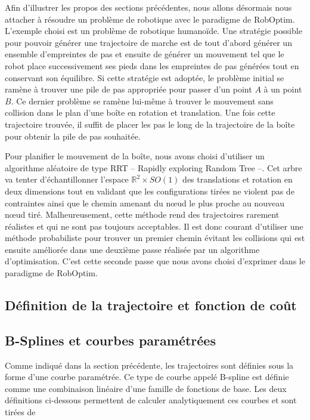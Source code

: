 Afin d'illustrer les propos des sections précédentes, nous allons
désormais nous attacher à résoudre un problème de robotique avec le
paradigme de RobOptim. L'exemple choisi est un problème de robotique
humanoïde. Une stratégie possible pour pouvoir générer une trajectoire
de marche est de tout d'abord générer un ensemble d'empreintes de pas
et ensuite de générer un mouvement tel que le robot place
successivement ses pieds dans les empreintes de pas générées tout en
conservant son équilibre. Si cette stratégie est adoptée, le problème
initial se ramène à trouver une pile de pas appropriée pour passer
d'un point $A$ à un point $B$. Ce dernier problème se ramène lui-même
à trouver le mouvement sans collision dans le plan d'une boîte en
rotation et translation. Une fois cette trajectoire trouvée, il suffit
de placer les pas le long de la trajectoire de la boîte pour obtenir
la pile de pas souhaitée.


Pour planifier le mouvement de la boîte, nous avons choisi d'utiliser
un algorithme aléatoire de type RRT -- Rapidly exploring Random Tree
--. Cet arbre va tenter d'échantillonner l'espace $\mathbb{R}^2 \times
SO(1)$ des translations et rotation en deux dimensions tout en validant
que les configurations tirées ne violent pas de contraintes ainsi que
le chemin amenant du n\oe ud le plus proche au nouveau n\oe ud
tiré. Malheureusement, cette méthode rend des trajectoires rarement
réalistes et qui ne sont pas toujours acceptables. Il est donc courant
d'utiliser une méthode probabiliste pour trouver un premier chemin
évitant les collisions qui est ensuite améliorée dans une deuxième
passe réalisée par un algorithme d'optimisation. C'est cette seconde
passe que nous avons choisi d'exprimer dans le paradigme de RobOptim.


\subsection{Définition de la trajectoire et fonction de coût}

\subsection{B-Splines et courbes paramétrées}

Comme indiqué dans la section précédente, les trajectoires sont
définies sous la forme d'une courbe paramétrée. Ce type de courbe
appelé B-spline est définie comme une
combinaison linéaire d'une famille de fonctions de base. Les deux
définitions ci-dessous permettent de calculer analytiquement ces
courbes et sont tirées de~\citep{algo.3d}

